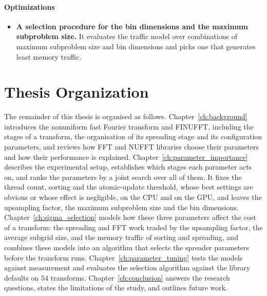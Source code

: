 \paragraph{Optimizations}
\begin{itemize}
    \item \textbf{A selection procedure for the bin dimensions and the maximum
    subproblem size.} It evaluates the traffic model over combinations of maximum subproblem size and bin dimensions
    and picks one that generates least memory traffic.
\end{itemize}

\section{Thesis Organization}

The remainder of this thesis is organised as follows.
Chapter~\ref{ch:background} introduces the nonuniform fast Fourier transform
and FINUFFT, including the stages of a transform, the organisation of its
spreading stage and its configuration parameters, and reviews how FFT and NUFFT
libraries choose their parameters and how their performance is explained.
Chapter~\ref{ch:parameter_importance} describes the experimental setup,
establishes which stages each parameter acts on, and ranks the parameters by a
joint search over all of them. It fixes the thread count, sorting and the
atomic-update threshold, whose best settings are obvious or whose effect is
negligible, on the CPU and on the GPU, and leaves the upsampling factor, the
maximum subproblem size and the bin dimensions.
Chapter~\ref{ch:sigma_selection} models how these three parameters affect the
cost of a transform: the spreading and FFT work traded by the upsampling factor,
the average subgrid size, and the memory traffic of sorting and spreading, and
combines these models into an algorithm that selects the spreader parameters
before the transform runs.
Chapter~\ref{ch:parameter_tuning} tests the models against measurement and
evaluates the selection algorithm against the library defaults on $54$
transforms.
Chapter~\ref{ch:conclusion} answers the research questions, states the
limitations of the study, and outlines future work.
